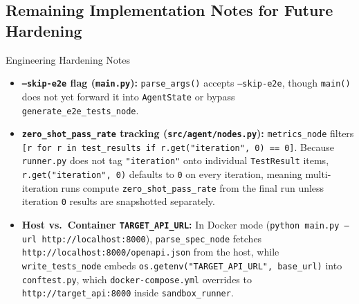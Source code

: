 \documentclass[11pt,a4paper]{article}
\begin{document}
\subsection{Remaining Implementation Notes for Future Hardening}
\begin{calloutbox}[WarnAmber]{Engineering Hardening Notes}
\begin{itemize}[leftmargin=1.5em]
    \item \textbf{\texttt{--skip-e2e} flag (\texttt{main.py}):} \texttt{parse\_args()} accepts \texttt{--skip-e2e}, though \texttt{main()} does not yet forward it into \texttt{AgentState} or bypass \texttt{generate\_e2e\_tests\_node}.
    \item \textbf{\texttt{zero\_shot\_pass\_rate} tracking (\texttt{src/agent/nodes.py}):} \texttt{metrics\_node} filters \texttt{[r for r in test\_results if r.get("iteration", 0) == 0]}. Because \texttt{runner.py} does not tag \texttt{"iteration"} onto individual \texttt{TestResult} items, \texttt{r.get("iteration", 0)} defaults to \texttt{0} on every iteration, meaning multi-iteration runs compute \texttt{zero\_shot\_pass\_rate} from the final run unless iteration \texttt{0} results are snapshotted separately.
    \item \textbf{Host vs.\ Container \texttt{TARGET\_API\_URL}:} In Docker mode (\texttt{python main.py --url http://localhost:8000}), \texttt{parse\_spec\_node} fetches \texttt{http://localhost:8000/openapi.json} from the host, while \texttt{write\_tests\_node} embeds \texttt{os.getenv("TARGET\_API\_URL", base\_url)} into \texttt{conftest.py}, which \texttt{docker-compose.yml} overrides to \texttt{http://target\_api:8000} inside \texttt{sandbox\_runner}.
\end{itemize}
\end{calloutbox}
\end{document}
